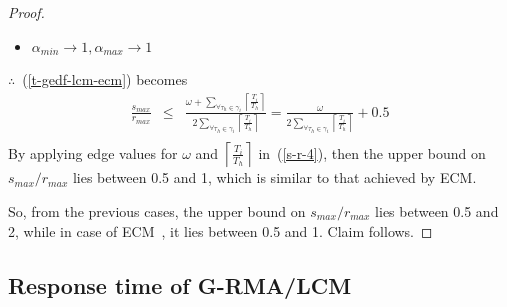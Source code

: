 \documentclass[conference]{IEEEtran}
\begin{document}
\begin{proof}
\begin{itemize}
\item $\alpha_{min} \rightarrow 1, \alpha_{max} \rightarrow 1$
\end{itemize}
$\therefore$~(\ref{t-gedf-lcm-ecm}) becomes
\begin{eqnarray}
\frac{s_{max}}{r_{max}}& \le & \frac{\omega+\sum_{\forall \tau_h \in \gamma_i}\left\lceil\frac{T_i}{T_h}\right\rceil}{2\sum_{\forall \tau_h \in \gamma_i}\left\lceil\frac{T_i}{T_h}\right\rceil} = \frac{\omega}{2\sum_{\forall \tau_h \in \gamma_i}\left\lceil\frac{T_i}{T_h}\right\rceil}+0.5\nonumber\\
\label{s-r-4}\end{eqnarray}
By applying edge values for $\omega$ and $\left\lceil\frac{T_i}{T_h}\right\rceil$ in~(\ref{s-r-4}), then the upper bound on $s_{max}/r_{max}$ lies between 0.5 and 1, which is similar to that achieved by ECM.

So, from the previous cases, the upper bound on $s_{max}/r_{max}$ lies between 0.5 and 2, while in case of ECM~\cite{stmconcurrencycontrol:emsoft11}, it lies between 0.5 and 1. Claim follows.
\end{proof}

\subsection{Response time of G-RMA/LCM}
\label{rma}
\end{document}

